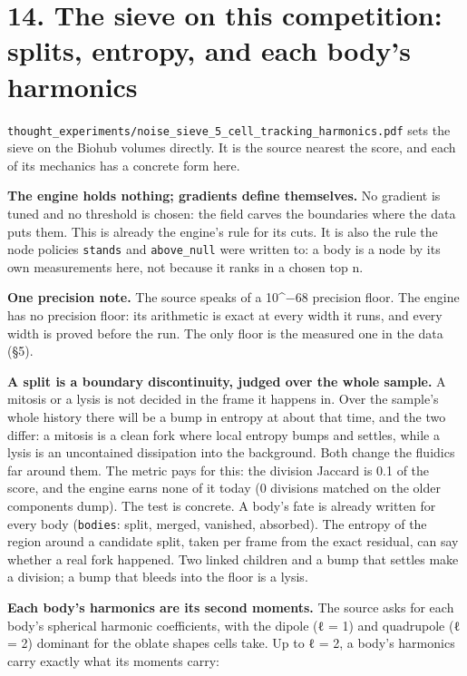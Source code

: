 \section{\texorpdfstring{14. The sieve on this competition: splits, entropy, and each body's harmonics}{14. The sieve on this competition: splits, entropy, and each body's harmonics}}

\texttt{thought\_\allowbreak{}experiments/\allowbreak{}noise\_\allowbreak{}sieve\_\allowbreak{}5\_\allowbreak{}cell\_\allowbreak{}tracking\_\allowbreak{}harmonics.\allowbreak{}pdf} sets the sieve on the Biohub volumes directly. It is the source nearest the score, and each of its mechanics has a concrete form here.

\textbf{The engine holds nothing; gradients define themselves.} No gradient is tuned and no threshold is chosen: the field carves the boundaries where the data puts them. This is already the engine's rule for its cuts. It is also the rule the node policies \texttt{stands} and \texttt{above\_\allowbreak{}null} were written to: a body is a node by its own measurements here, not because it ranks in a chosen top n.

\textbf{One precision note.} The source speaks of a 10\textasciicircum{}−68 precision floor. The engine has no precision floor: its arithmetic is exact at every width it runs, and every width is proved before the run. The only floor is the measured one in the data (§5).

\textbf{A split is a boundary discontinuity, judged over the whole sample.} A mitosis or a lysis is not decided in the frame it happens in. Over the sample's whole history there will be a bump in entropy at about that time, and the two differ: a mitosis is a clean fork where local entropy bumps and settles, while a lysis is an uncontained dissipation into the background. Both change the fluidics far around them. The metric pays for this: the division Jaccard is 0.1 of the score, and the engine earns none of it today (0 divisions matched on the older components dump). The test is concrete. A body's fate is already written for every body (\texttt{bodies}: split, merged, vanished, absorbed). The entropy of the region around a candidate split, taken per frame from the exact residual, can say whether a real fork happened. Two linked children and a bump that settles make a division; a bump that bleeds into the floor is a lysis.

\textbf{Each body's harmonics are its second moments.} The source asks for each body's spherical harmonic coefficients, with the dipole (ℓ = 1) and quadrupole (ℓ = 2) dominant for the oblate shapes cells take. Up to ℓ = 2, a body's harmonics carry exactly what its moments carry:

